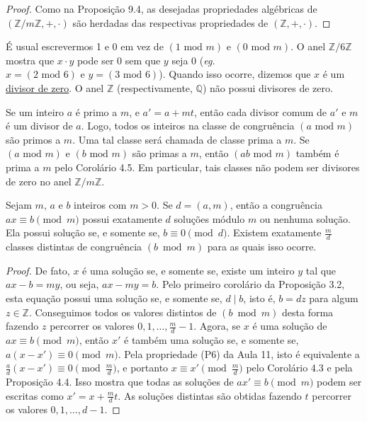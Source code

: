 \begin{proof}
Como na Proposição 9.4, as desejadas propriedades algébricas de $(\mathbb{Z}/m\mathbb{Z}, +, \cdot)$ são herdadas das respectivas
propriedades de $(\mathbb{Z}, +, \cdot)$.
\end{proof}

É usual escrevermos 1 e 0 em vez de $(1 \text{ mod } m)$ e $(0 \text{ mod } m)$. O anel $\mathbb{Z}/6\mathbb{Z}$ mostra que
$x \cdot y$ pode ser $0$ sem que $y$ seja $0$ (\emph{eg.} $x = (2 \text{ mod } 6) \text{ e } y = (3 \text{ mod } 6)$).
Quando isso ocorre, dizemos que $x$ é um \underline{divisor de zero}. O anel $\mathbb{Z}$ (respectivamente, $\mathbb{Q}$) 
não possui divisores de zero.

Se um inteiro $a$ é primo a $m$, e $a' = a + mt$, então cada divisor comum de $a'$ e $m$ é um divisor de $a$.
Logo, todos os inteiros na classe de congruência $(a \text{ mod } m)$ são primos a $m$. Uma tal classe será 
chamada de classe prima a $m$. Se $(a \text{ mod } m)$ e $(b \text{ mod } m)$ são primas a $m$, então $(ab \text{ mod } m)$ também é prima
a $m$ pelo Corolário 4.5. Em particular, tais classes não podem ser divisores de zero no anel $\mathbb{Z}/m\mathbb{Z}$.

\begin{proposicao}
Sejam $m$, $a$ e $b$ inteiros com $m > 0$. Se $d = (a,m)$, então a congruência
$ax \equiv b \pmod{m}$ possui exatamente $d$ soluções módulo $m$ ou nenhuma solução. 
Ela possui solução se, e somente se, $b \equiv 0 \pmod{d}$. Existem exatamente $\frac{m}{d}$ 
classes distintas de congruência $(b \bmod m)$ para as quais isso ocorre.
\end{proposicao}

\begin{proof}
De fato, $x$ é uma solução se, e somente se, existe um inteiro $y$ tal que
$ax - b = my$, ou seja, $ax - my = b$. Pelo primeiro corolário da Proposição 3.2, esta equação 
possui uma solução se, e somente se, $d \mid b$, isto é, $b = dz$  para algum $z \in \mathbb{Z}$. 
Conseguimos todos os valores distintos de $(b \bmod m)$ desta forma fazendo $z$ percorrer 
os valores $0, 1, \ldots, \frac{m}{d} - 1$. Agora, se $x$ é uma solução de $ax \equiv b \pmod{m}$, 
então $x'$ é também uma solução se, e somente se, $a(x - x') \equiv 0 \pmod{m}$.
Pela propriedade (P6) da Aula 11, isto é equivalente a $\frac{a}{d}(x - x') \equiv 0 \pmod{\frac{m}{d}}$,
e portanto $x \equiv x' \pmod{\frac{m}{d}}$ pelo Corolário 4.3 e pela Proposição 4.4. Isso mostra que todas 
as soluções de $ax' \equiv b \pmod{m}$ podem ser escritas como $x' = x + \frac{m}{d}t$.
As soluções distintas são obtidas fazendo $t$ percorrer os valores $0, 1, \ldots, d - 1$.
\end{proof}

